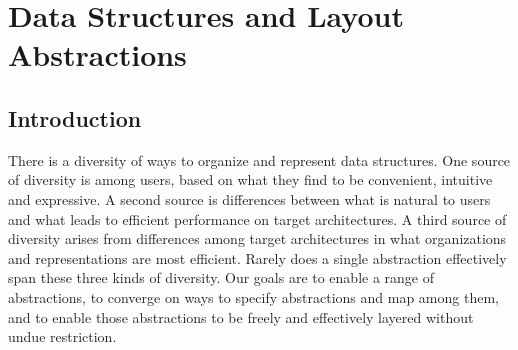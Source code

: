 \chapter{Data Structures and Layout Abstractions}
\label{ch:datastructures}





\section{Introduction}

There is a diversity of ways to organize and represent data structures.  One source of diversity is among users, based on what they find to be convenient, intuitive and expressive.  A second source is differences between what is natural to users and what leads to efficient performance on target architectures.  A third source of diversity arises from differences among target architectures in what organizations and representations are most efficient.  Rarely does a single abstraction effectively span these three kinds of diversity.  Our goals are to enable a range of abstractions, to converge on ways to specify abstractions and map among them, and to enable those abstractions to be freely and effectively layered without undue restriction.

